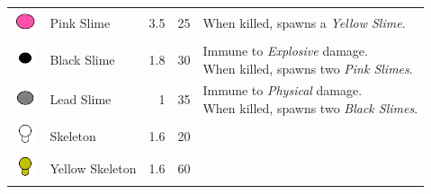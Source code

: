 \begin{table}[H]
\begin{tabular}{m{9mm}m{25mm}D{.}{.}{-1}rm{0.48\textwidth}}
        \includegraphics[height=7mm]{img/Icons/Attackers/Pink Slime.png}              & \footnotesize{Pink Slime}              & 3.5                 & 25               & \footnotesize{When killed, spawns a \emph{Yellow Slime}.}                                                                                                   \\
        \includegraphics[height=7mm]{img/Icons/Attackers/Black Slime.png}             & \footnotesize{Black Slime}             & 1.8                 & 30               & \footnotesize{Immune to \emph{Explosive} damage. \newline When killed, spawns two \emph{Pink Slimes}.}                                                      \\
        \includegraphics[height=7mm]{img/Icons/Attackers/Lead Slime.png}              & \footnotesize{Lead Slime}              & 1                   & 35               & \footnotesize{Immune to \emph{Physical} damage. \newline When killed, spawns two \emph{Black Slimes}.}                                                      \\
        \includegraphics[height=7mm]{img/Icons/Attackers/Skeleton.png}                & \footnotesize{Skeleton}                & 1.6                 & 20               &                                                                                                                                                             \\
        \includegraphics[height=7mm]{img/Icons/Attackers/Yellow Skeleton.png}         & \footnotesize{Yellow Skeleton}         & 1.6                 & 60               &                                                                                                                                                             \\

\end{tabular}
\end{table}
